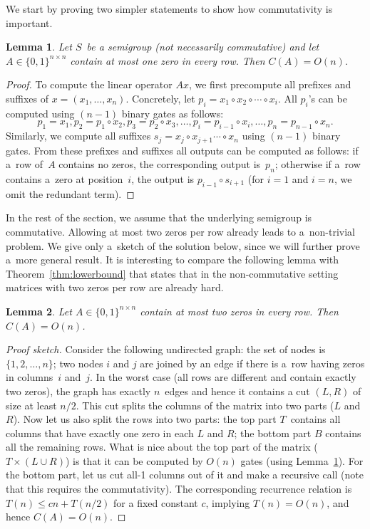 \documentclass[11pt,letterpaper]{article}
\newtheorem{lemma}{Lemma}
\begin{document}
We start by proving two simpler statements to show
how commutativity is important.

\begin{lemma}\label{lemma:easy}
Let $S$~be a semigroup (not necessarily commutative) and let
$A \in \{0,1\}^{n \times n}$ contain at most 
one zero in every row. Then
$C(A) = O(n)$.
\end{lemma}
\begin{proof}
To compute the linear operator $Ax$, we first
precompute all prefixes and suffixes of $x=(x_1, \dotsc, x_n)$.
Concretely, let $p_i=x_1 \circ x_2 \circ \dotsb \circ x_i$. All $p_i$'s can be computed
using $(n-1)$ binary gates as follows:
\[
p_1=x_1, p_2=p_1 \circ x_2, p_3=p_2 \circ x_3, \dotsc, p_i=p_{i-1} \circ x_i, \dotsc, p_n=p_{n-1}\circ x_n.
\]
Similarly, we compute all suffixes 
$s_j=x_j \circ x_{j+1} \dotsb \circ x_n$ using
$(n-1)$ binary gates. From these prefixes and suffixes 
all outputs can be
computed as follows: if a~row of~$A$ contains no zeros, 
the corresponding
output is~$p_n$; otherwise if a~row contains a~zero at position~$i$, the
output is $p_{i-1} \circ s_{i+1}$ (for $i=1$ and $i=n$, we omit the redundant
term).
\end{proof}

In the rest of the section, we assume that the 
underlying semigroup is
commutative. Allowing at most two zeros per row already leads to a~non-trivial
problem. We give only a~sketch of the solution below, since we will further
prove a~more general result. It is interesting to compare the following lemma
with Theorem~\ref{thm:lowerbound} that states that in the
non-commutative setting matrices with two zeros per row are already hard.

\begin{lemma} \label{lem:at_most_2}
Let $A \in \{0,1\}^{n \times n}$ contain at most two zeros in every row. Then
$C(A) = O(n)$.
\end{lemma}
\begin{proof}[Proof sketch]
Consider the following undirected graph: the set of nodes is $\{1,2,\dotsc,n\}$;
two nodes $i$ and $j$ are joined by an edge if there is a~row having zeros in
columns~$i$ and~$j$. In the worst case (all rows are different and contain
exactly two zeros), the graph has exactly $n$~edges and hence it contains a cut
$(L,R)$ of size at least $n/2$. This cut splits the columns of the matrix into
two parts ($L$ and $R$). Now let us also split the rows into two parts: the top
part $T$~contains all columns that have exactly one zero in each $L$ and $R$;
the bottom part $B$ contains all the remaining rows. What is nice about the top
part of the matrix ($T \times (L \cup R)$) is that it can be computed by $O(n)$
gates (using Lemma~\ref{lemma:easy}). For the bottom part, let us cut all-1
columns out of it and make a recursive call (note that this requires the
commutativity). The corresponding recurrence relation is $T(n) \le cn + T(n/2)$
for a fixed constant $c$, implying $T(n)=O(n)$, and hence $C(A) = O(n)$.
\end{proof}
\end{document}
